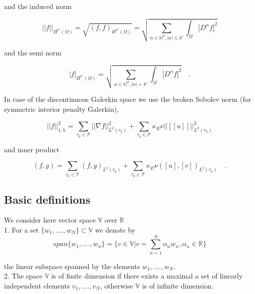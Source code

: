 \documentclass[a4paper]{book}
\begin{document}
\begin{appendices}
and the induced norm 

\begin{equation}
||f||_{H^{k'} (\Omega)} = \sqrt{(f,f)_{H^{k'}(\Omega)}} = \sqrt{\sum_{\alpha \in \mathbb{N}^d, |\alpha| \leq k'} \int_\Omega |D^\alpha f|^2}
\end{equation}

and the semi norm 

\begin{equation}
|f|_{H^{k'} (\Omega)} = \sqrt{\sum_{\alpha \in \mathbb{N}^d, |\alpha| = k'} \int_\Omega |D^\alpha f|^2} \quad \textrm{.}
\end{equation}

In case of the discontinuous Galerkin space we use the broken Sobolev norm (for symmetric interior penalty Galerkin), \cite{Montlaur2}

\begin{equation}
||f||_{1,h}^2 = \sum_{\tau_k \in \mathcal{T}} ||\nabla f||_{L^2(\tau_k)}^2 + \sum_{\tau_k \in \mathcal{T}} \kappa_E \nu ||[[u]]||_{L^2 (\tau_k)}^2
\end{equation}

and inner product

\begin{equation}
(f,g) = \sum_{\tau_k \in \mathcal{T}} (f,g)_{L^2(\tau_k)} + \sum_{\tau_k \in \mathcal{T}} \kappa_E \nu ([u],[v])_{L^2 (\tau_k)} \quad \textrm{.}
\end{equation}

\subsection{Basic definitions}

We consider here vector space $\mathbb{V}$ over $\mathbb{R}$\\

1. For a set $\lbrace w_1,....,w_N \rbrace \subset \mathbb{V}$ we denote by \\
\begin{equation} \label{vector space}
span \lbrace w_1,....,w_n \rbrace = \lbrace v \in \mathbb{V} | v = \sum_{n=1}^N \alpha_n w_n, \alpha_n \in \mathbb{R} \rbrace
\end{equation} 

the linear subspace spanned by the elements $w_1,....,w_N$.\\

2. The space $\mathbb{V}$ is of finite dimension if there exists a maximal a set of linearly independent elements $v_1,....,v_N$, otherwise $\mathbb{V}$ is of infinite dimension.\\


\end{appendices}
\end{document}
